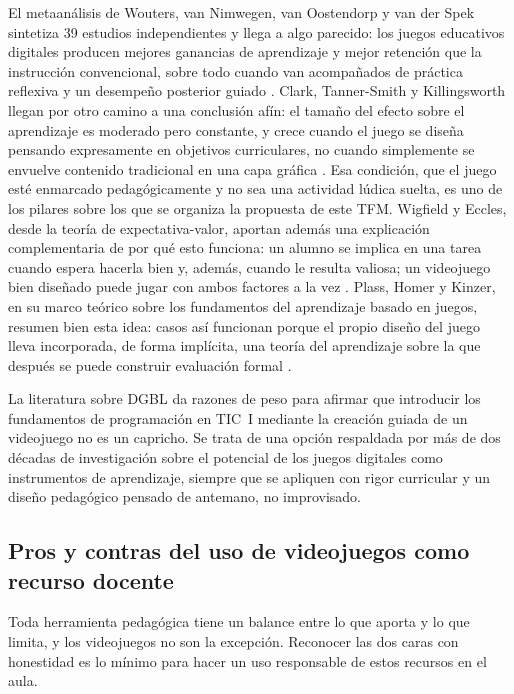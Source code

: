 \documentclass[a4paper,12pt]{article}
\begin{document}
El metaanálisis de Wouters, van Nimwegen, van Oostendorp y van der Spek sintetiza 39 estudios independientes y llega a algo parecido: los juegos educativos digitales producen mejores ganancias de aprendizaje y mejor retención que la instrucción convencional, sobre todo cuando van acompañados de práctica reflexiva y un desempeño posterior guiado \citep{wouters2013meta}. Clark, Tanner-Smith y Killingsworth llegan por otro camino a una conclusión afín: el tamaño del efecto sobre el aprendizaje es moderado pero constante, y crece cuando el juego se diseña pensando expresamente en objetivos curriculares, no cuando simplemente se envuelve contenido tradicional en una capa gráfica \citep{clark2016digital}. Esa condición, que el juego esté enmarcado pedagógicamente y no sea una actividad lúdica suelta, es uno de los pilares sobre los que se organiza la propuesta de este TFM. Wigfield y Eccles, desde la teoría de expectativa-valor, aportan además una explicación complementaria de por qué esto funciona: un alumno se implica en una tarea cuando espera hacerla bien y, además, cuando le resulta valiosa; un videojuego bien diseñado puede jugar con ambos factores a la vez \citep{wigfield2000expectancy}. Plass, Homer y Kinzer, en su marco teórico sobre los fundamentos del aprendizaje basado en juegos, resumen bien esta idea: casos así funcionan porque el propio diseño del juego lleva incorporada, de forma implícita, una teoría del aprendizaje sobre la que después se puede construir evaluación formal \citep{plass2015foundations}.

La literatura sobre DGBL da razones de peso para afirmar que introducir los fundamentos de programación en TIC~I mediante la creación guiada de un videojuego no es un capricho. Se trata de una opción respaldada por más de dos décadas de investigación sobre el potencial de los juegos digitales como instrumentos de aprendizaje, siempre que se apliquen con rigor curricular y un diseño pedagógico pensado de antemano, no improvisado.

\subsection{Pros y contras del uso de videojuegos como recurso docente}

Toda herramienta pedagógica tiene un balance entre lo que aporta y lo que limita, y los videojuegos no son la excepción. Reconocer las dos caras con honestidad es lo mínimo para hacer un uso responsable de estos recursos en el aula.
\end{document}
